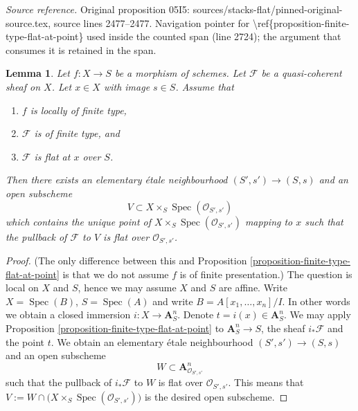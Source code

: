 \documentclass[10pt,a4paper]{amsart}
\theoremstyle{plain}
\newtheorem{lemma}[subsection]{Lemma}
\theoremstyle{definition}
\theoremstyle{remark}
\numberwithin{equation}{subsection}
\def\Spec{\mathop{\mathrm{Spec}}}
\begin{document}
\noindent\textit{Source reference.} Original proposition 05I5: sources/stacks-flat/pinned-original-source.tex, source lines 2477--2477. Navigation pointer for \textbackslash{}ref\{proposition-finite-type-flat-at-point\} used inside the counted span (line 2724); the argument that consumes it is retained in the span.\par\medskip
\begin{lemma}
\label{lemma-finite-type-flat-at-point}
Let $f : X \to S$ be a morphism of schemes.
Let $\mathcal{F}$ be a quasi-coherent sheaf on $X$.
Let $x \in X$ with image $s \in S$.
Assume that
\begin{enumerate}
\item $f$ is locally of finite type,
\item $\mathcal{F}$ is of finite type, and
\item $\mathcal{F}$ is flat at $x$ over $S$.
\end{enumerate}
Then there exists an elementary \'etale neighbourhood $(S', s') \to (S, s)$
and an open subscheme
$$
V \subset X \times_S \Spec(\mathcal{O}_{S', s'})
$$
which contains the unique point of
$X \times_S \Spec(\mathcal{O}_{S', s'})$ mapping to $x$
such that the pullback of $\mathcal{F}$ to $V$ is flat over
$\mathcal{O}_{S', s'}$.
\end{lemma}

\begin{proof}
(The only difference between this and
Proposition \ref{proposition-finite-type-flat-at-point}
is that we do not assume $f$ is of finite presentation.)
The question is local on $X$ and $S$, hence we may assume $X$ and $S$
are affine. Write $X = \Spec(B)$, $S = \Spec(A)$ and write
$B = A[x_1, \ldots, x_n]/I$. In other words we obtain a closed immersion
$i : X \to \mathbf{A}^n_S$. Denote $t = i(x) \in \mathbf{A}^n_S$.
We may apply
Proposition \ref{proposition-finite-type-flat-at-point}
to $\mathbf{A}^n_S \to S$, the sheaf $i_*\mathcal{F}$
and the point $t$. We obtain an elementary
\'etale neighbourhood $(S', s') \to (S, s)$ and an open subscheme
$$
W \subset \mathbf{A}^n_{\mathcal{O}_{S', s'}}
$$
such that the pullback of $i_*\mathcal{F}$ to $W$ is flat over
$\mathcal{O}_{S', s'}$. This means that
$V := W \cap \big(X \times_S \Spec(\mathcal{O}_{S', s'})\big)$
is the desired open subscheme.
\end{proof}
\end{document}
